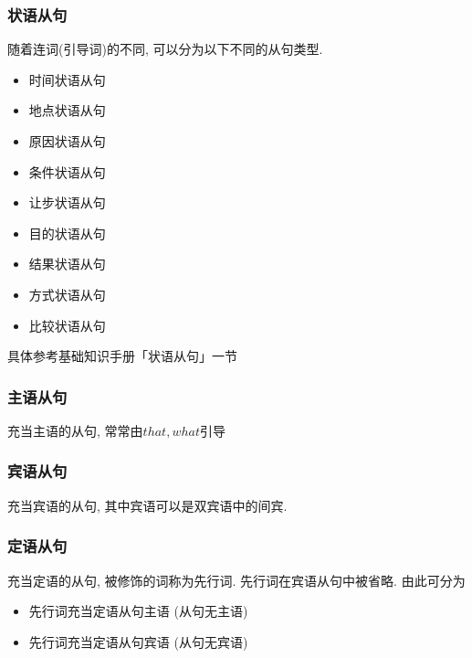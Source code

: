 \documentclass[a4paper]{article}
\begin{document}
\subsubsection{状语从句}
随着连词(引导词)的不同, 可以分为以下不同的从句类型. 
\begin{itemize}
  \item 时间状语从句
  \item 地点状语从句
  \item 原因状语从句
  \item 条件状语从句
  \item 让步状语从句
  \item 目的状语从句
  \item 结果状语从句
  \item 方式状语从句
  \item 比较状语从句
\end{itemize}
具体参考基础知识手册「状语从句」一节
\subsubsection{主语从句}
充当主语的从句, 常常由$that,what$引导
\subsubsection{宾语从句}
充当宾语的从句, 其中宾语可以是双宾语中的间宾. 
\subsubsection{定语从句}
充当定语的从句, 被修饰的词称为先行词. 先行词在宾语从句中被省略. 由此可分为
\begin{itemize}
  \item 先行词充当定语从句主语 (从句无主语)
  \item 先行词充当定语从句宾语 (从句无宾语)
\end{itemize}
\end{document}

